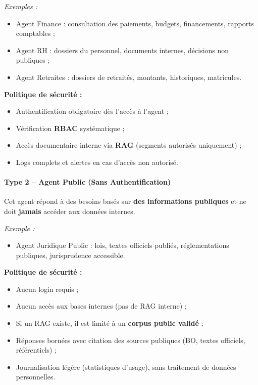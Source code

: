 \documentclass[12pt, a4paper]{report}
\begin{document}
\textit{Exemples :}
\begin{itemize}
  \item Agent Finance : consultation des paiements, budgets,
        financements, rapports comptables ;
  \item Agent RH : dossiers du personnel, documents internes, décisions
        non publiques ;
  \item Agent Retraites : dossiers de retraités, montants, historiques,
        matricules.
\end{itemize}

\textbf{Politique de sécurité :}
\begin{itemize}
  \item Authentification obligatoire dès l'accès à l'agent ;
  \item Vérification \textbf{RBAC} systématique ;
  \item Accès documentaire interne via \textbf{RAG} (segments autorisés
        uniquement) ;
  \item Logs complets et alertes en cas d'accès non autorisé.
\end{itemize}

\paragraph{Type 2 -- Agent Public (Sans Authentification)}
Cet agent répond à des besoins basés sur \textbf{des informations
publiques} et ne doit \textbf{jamais} accéder aux données internes.

\textit{Exemple :}
\begin{itemize}
  \item Agent Juridique Public : lois, textes officiels publiés,
        réglementations publiques, jurisprudence accessible.
\end{itemize}

\textbf{Politique de sécurité :}
\begin{itemize}
  \item Aucun login requis ;
  \item Aucun accès aux bases internes (pas de RAG interne) ;
  \item Si un RAG existe, il est limité à un \textbf{corpus public
        validé} ;
  \item Réponses bornées avec citation des sources publiques (BO, textes
        officiels, référentiels) ;
  \item Journalisation légère (statistiques d'usage), sans traitement de
        données personnelles.
\end{itemize}
\end{document}
